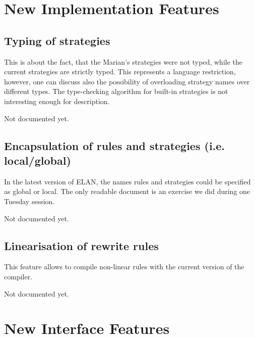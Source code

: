 \documentclass{article}
\newcommand{\elan}{{\sf ELAN}}
\begin{document}
\section{New Implementation Features}

\subsection{Typing of strategies}

This is about the fact, that the Marian's strategies were not typed,
while the current strategies are strictly typed. This represents
a language restriction, however, one can discuss also the possibility
of overloading strategy names over different types. The type-checking
algorithm for built-in strategies is not interesting enough for description.

Not documented yet.

\subsection{Encapsulation of rules and strategies (i.e. local/global)}

In the latest version of \elan, the names rules and strategies could
be specified as global or local.
The only readable document is an exercise we did during one 
Tuesday session.

Not documented yet.

\subsection{Linearisation of rewrite rules}

This feature allows to compile non-linear rules with the current
version of the compiler.

Not documented yet.


\section{New Interface Features}
\end{document}
